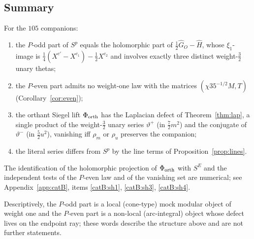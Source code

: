 \subsection{Summary}
\begin{theorem}\label{thm:hybrid}
For the $105$ companions:
\begin{enumerate}[label=(\roman*),leftmargin=2em]
\item the $P$-odd part of $S^p$ equals the holomorphic part of $\frac12\widehat G_O-\widehat H$, whose $\xi_1$-image is $\frac14(X^{c'}-X^{c_1})-\frac12X^{c_2}$ and involves exactly
three distinct weight-$\frac32$ unary thetas;
\item the $P$-even part admits no weight-one law with the matrices $(\chi35^{-1/2}M,T)$ (Corollary~\ref{cor:even});
\item the orthant Siegel lift $\Phi_{\rm orth}$ has the Laplacian defect of Theorem~\ref{thm:lap}, a single product of the weight-$\frac32$ unary series $\vartheta^+$
(in $\frac72m^2$) and the conjugate of $\vartheta^-$ (in $\frac52u^2$), vanishing iff $\rho_m$ or $\rho_u$ preserves the companion;
\item the literal series differs from $S^p$ by the line terms of Proposition~\ref{prop:lines}.
\end{enumerate}
\end{theorem}
\begin{catbremark}
The identification of the holomorphic projection of $\Phi_{\rm orth}$ with $S^E$ and the independent tests of the $P$-even law and of the vanishing set are numerical; see
Appendix~\ref{app:catB}, items \ref{catB:sh1}, \ref{catB:sh3}, \ref{catB:sh4}.
\end{catbremark}
\begin{remark}
Descriptively, the $P$-odd part is a local (cone-type) mock modular object of weight one and the $P$-even part is a non-local (arc-integral) object whose defect lives on the
endpoint ray; these words describe the structure above and are not further statements.
\end{remark}
